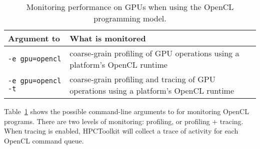 \begin{table}[h]
\centering
\begin{tabular}{|l|p{3.5in}|}\hline
Argument to \hpcrun{} & What is monitored\\\hline\hline
{\tt -e gpu=opencl} & coarse-grain profiling of  GPU operations using a platform's OpenCL runtime\\\hline
{\tt -e gpu=opencl -t} & coarse-grain profiling and tracing of  GPU operations using a platform's OpenCL runtime\\\hline
\end{tabular}
\caption{Monitoring performance on GPUs when using the OpenCL programming model.}
\label{opencl-monitoring-options} 
\end{table}


Table~\ref{opencl-monitoring-options} shows the possible command-line arguments to \hpcrun{} for monitoring  OpenCL programs. There are two levels of monitoring: profiling, or profiling + tracing. When tracing is enabled,  HPCToolkit will collect a trace of activity for each OpenCL command queue. 



